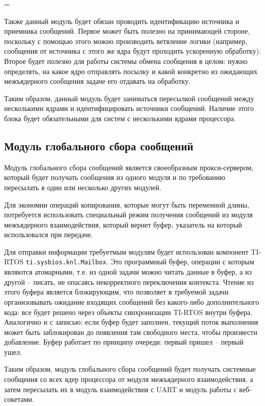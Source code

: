 \font=\origiwstr

Также данный модуль будет обязан проводить идентификацию источника и
приемника сообщений. Первое может быть полезно на принимающей стороне, поскольку
с помощью этого можно производить ветвление логики (например, сообщения от
источника с этого же ядра будут проходить ускоренную обработку). Второе будет
полезно для работы системы обмена сообщения в целом: нужно определять, на какое
ядро отправлять посылку и какой конкретно из ожидающих межъядерного сообщения
задаче его отдавать на обработку.

Таким образом, данный модуль будет заниматься пересылкой сообщений между
несколькими ядрами и идентифицировать источники сообщений. Наличие этого
блока будет обязательными для систем с несколькими ядрами процессора.

\subsection{Модуль глобального сбора сообщений}

Модуль глобального сбора сообщений является своеобразным прокси-сервером,
который будет получать сообщения из одного модуля и по требованию пересылать
в один или несколько других модулей.

Для экономии операций копирования, которые могут быть переменной длины,
потребуется использовать специальный режим получения сообщений из модуля
межъядерного взаимодействия, который вернет буфер, указатель на который
использовался при передаче.

Для отправки информации требуетмым модулям будет использован компонент TI-RTOS
\texttt{ti.sysbios.knl.Mailbox}. Это программный буфер, операции
с которым являются атомарными, т.е. из одной задачи можно читать данные в буфер,
а из другой -- писать, не опасаясь некорректного переключения контекста.
Чтение из этого буфера является блокирующим, что позволяет в требуемой задачи
организовывать ожидание входящих сообщений без какого-либо дополнительного кода:
все будет решено через объекты синхронизации TI-RTOS внутри буфера. Аналогично
и с записью: если буфер будет заполнен, текущий поток выполнения может быть
заблокирован до появления там свободного места, чтобы произвести добавление.
Буфер работает по принципу очереди: первый пришел -- первый ушел.

Таким образом, модуль глобального сбора сообщений будет получать системные
сообщения со всех ядер процессора от модуля межъядерного взаимодействия,
а затем пересылать их в модуль взаимодействия с UART и модуль работы
с веб-сокетами.

